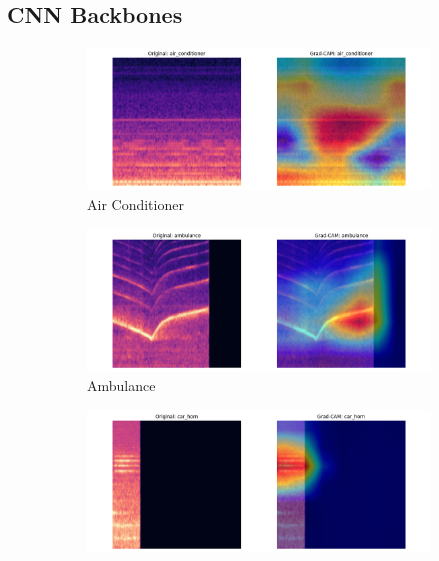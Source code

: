 \documentclass[11pt]{article}
\begin{document}
\subsection{CNN Backbones}
\begin{figure}[ht]
    \centering
    \begin{subfigure}[b]{0.24\textwidth}
        \centering
        \includegraphics[width=\textwidth]{latex/assets/efficientnet_fold7_gradcam/gradcam_air_conditioner_0.png}
        \caption{Air Conditioner}
    \end{subfigure}
    \hfill
    \begin{subfigure}[b]{0.24\textwidth}
        \centering
        \includegraphics[width=\textwidth]{latex/assets/efficientnet_fold7_gradcam/gradcam_ambulance_0.png}
        \caption{Ambulance}
    \end{subfigure}
    \hfill
    \begin{subfigure}[b]{0.24\textwidth}
        \centering
        \includegraphics[width=\textwidth]{latex/assets/efficientnet_fold7_gradcam/gradcam_car_horn_0.png}

\end{subfigure}
\end{figure}
\end{document}
